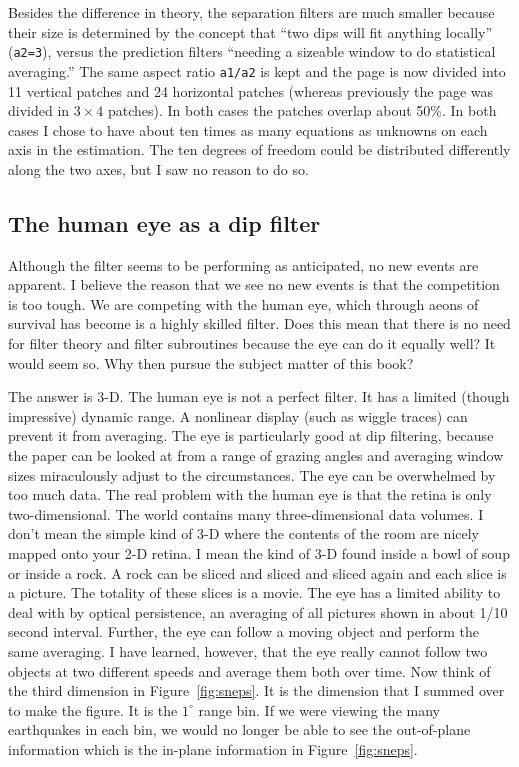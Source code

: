 
\par
Besides the difference in theory,
the separation filters are much smaller
because their size is determined by
the concept that ``two dips will fit anything locally''
({\tt a2=3}),
versus the prediction filters
``needing a sizeable window to do statistical averaging.''
The same aspect ratio {\tt a1/a2} is kept and
the page is now divided into
11 vertical patches and 24 horizontal patches
(whereas previously the page was divided in $3\times 4$ patches).
In both cases the patches overlap about 50\%.
In both cases I chose to have about ten times as many equations
as unknowns on each axis in the estimation.
The ten degrees of freedom could be distributed differently
along the two axes, but I saw no reason to do so.

\subsection{The human eye as a dip filter}

\par
Although the filter seems to be performing as anticipated,
no new events are apparent.
I believe the reason that we see no new events is
that the competition is too tough.
We are competing with the human eye, which
through aeons of survival has become is a highly skilled filter.
Does this mean that there is no need for filter theory and filter subroutines
because the eye can do it equally well?
It would seem so.
Why then pursue the subject matter of this book?
\par
The answer is 3-D.
The human eye is not a perfect filter.
It has a limited (though impressive) dynamic range.
A nonlinear display (such as wiggle traces)
can prevent it from averaging.
The eye is particularly good at dip filtering,
because the paper can be looked at from a range of grazing angles
and averaging window sizes miraculously adjust to the circumstances.
The eye can be overwhelmed by too much data.
The real problem with the human eye
is that the retina is only two-dimensional.
The world contains many three-dimensional data volumes.
I don't mean the simple kind of 3-D where the contents of the room
are nicely mapped onto your 2-D retina.
I mean the kind of 3-D found inside a bowl of soup or inside a rock.
A rock can be sliced and sliced and sliced again and each slice is a picture.
The totality of these slices is a movie.
The eye has a limited ability to deal with  by optical persistence,
an averaging of all pictures shown in about 1/10 second interval.
Further, the eye can follow a moving object and perform the same
averaging.
I have learned, however, that the eye really cannot follow two objects
at two different speeds and average them both over time.
Now think of the third dimension in Figure~\ref{fig:sneps}.
It is the dimension that I summed over to make the figure.
It is the $1^\circ$ range bin.
If we were viewing the many earthquakes in each bin,
we would no longer be able to see the out-of-plane information
which is the in-plane information in Figure~\ref{fig:sneps}.

